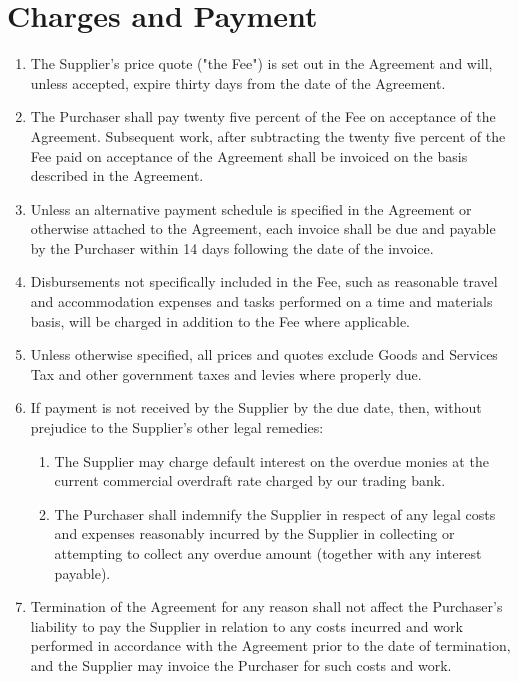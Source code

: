 \documentclass[nz-terms]{subfiles}
\begin{document}
\section{Charges and Payment}

\begin{enumerate}
\item The Supplier's price quote ("the Fee") is set out in the Agreement and
will, unless accepted, expire thirty days from the date of the Agreement.
\item The Purchaser shall pay twenty five percent of the Fee on acceptance of
the Agreement. Subsequent work, after subtracting the twenty five percent of
the Fee paid on acceptance of the Agreement shall be invoiced on the basis
described in the Agreement.
\item Unless an alternative payment schedule is specified in the Agreement or
otherwise attached to the Agreement, each invoice shall be due and payable by
the Purchaser within 14 days following the date of the invoice.
\item Disbursements not specifically included in the Fee, such as reasonable
travel and accommodation expenses and tasks performed on a time and materials
basis, will be charged in addition to the Fee where applicable.
\item Unless otherwise specified, all prices and quotes exclude Goods and
Services Tax and other government taxes and levies where properly due.
\item If payment is not received by the Supplier by the due date, then, without
prejudice to the Supplier's other legal remedies:
    \begin{enumerate}
    \item The Supplier may charge default interest on the overdue monies at the
    current commercial overdraft rate charged by our trading bank.
    \item The Purchaser shall indemnify the Supplier in respect of any legal
    costs and expenses reasonably incurred by the Supplier in collecting or
    attempting to collect any overdue amount (together with any interest
    payable).
    \end{enumerate}
\item Termination of the Agreement for any reason shall not affect the
Purchaser's liability to pay the Supplier in relation to any costs incurred
and work performed in accordance with the Agreement prior to the date of
termination, and the Supplier may invoice the Purchaser for such costs and
work.
\end{enumerate}
\end{document}
